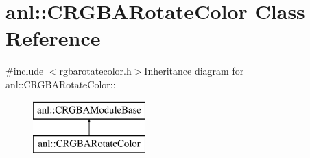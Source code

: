 \hypertarget{classanl_1_1CRGBARotateColor}{
\section{anl::CRGBARotateColor Class Reference}
\label{classanl_1_1CRGBARotateColor}
}


{\ttfamily \#include $<$rgbarotatecolor.h$>$}Inheritance diagram for anl::CRGBARotateColor::\begin{figure}[H]
\begin{center}
\leavevmode
\includegraphics[height=2cm]{classanl_1_1CRGBARotateColor}
\end{center}
\end{figure}
